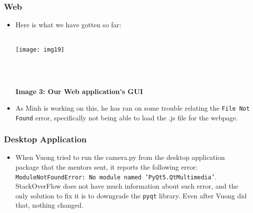 \documentclass{article}
\newcommand{\code}[1]{\texttt{#1}}
\begin{document}
	\subsubsection{Web}
		\begin{itemize}
		\item Here is what we have gotten so far:\\\\
		 \centerline{\texttt{[image: img19]}}\\\\
		\centerline{\textbf{Image 3: Our Web application's GUI}}
		\item As Minh is working on this, he has ran on some trouble relating the \code{File Not Found} error, specifically not being able to load the .js file for the webpage.
		\end{itemize}
	\subsubsection{Desktop Application}
		\begin{itemize}
			\item When Vuong tried to run the camera.py from the desktop application package that the mentors sent, it reports the following error: \code{ModuleNotFoundError: No module named 'PyQt5.QtMultimedia'}. StackOverFlow does not have much information about such error, and the only solution to fix it is to downgrade the \code{pyqt} library. Even after Vuong did that, nothing changed.
		\end{itemize}
\end{document}
